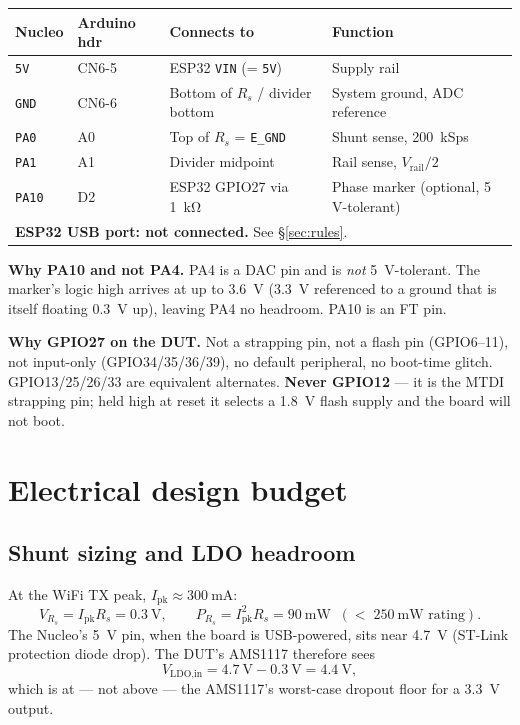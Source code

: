 \documentclass[11pt,a4paper]{article}
\begin{document}
\begin{center}
\begin{tabularx}{\textwidth}{llXl}
\toprule
\textbf{Nucleo} & \textbf{Arduino hdr} & \textbf{Connects to} & \textbf{Function} \\
\midrule
\texttt{5V}   & CN6-5 & ESP32 \texttt{VIN} (= \texttt{5V}) & Supply rail \\
\texttt{GND}  & CN6-6 & Bottom of $R_s$ / divider bottom   & System ground, ADC reference \\
\texttt{PA0}  & A0    & Top of $R_s$ = \texttt{E\_GND}     & Shunt sense, \SI{200}{kSps} \\
\texttt{PA1}  & A1    & Divider midpoint                    & Rail sense, $V_\text{rail}/2$ \\
\texttt{PA10} & D2    & ESP32 GPIO27 via \SI{1}{\kilo\ohm}  & Phase marker (optional, 5\,V-tolerant) \\
\midrule
\multicolumn{4}{l}{\textbf{ESP32 USB port: not connected.} See \S\ref{sec:rules}.} \\
\bottomrule
\end{tabularx}
\end{center}

\noindent
\textbf{Why PA10 and not PA4.} PA4 is a DAC pin and is \emph{not} \SI{5}{\volt}-tolerant.
The marker's logic high arrives at up to \SI{3.6}{\volt} (\SI{3.3}{\volt} referenced to a
ground that is itself floating \SI{0.3}{\volt} up), leaving PA4 no headroom. PA10 is an FT pin.

\medskip
\noindent
\textbf{Why GPIO27 on the DUT.} Not a strapping pin, not a flash pin (GPIO6--11), not
input-only (GPIO34/35/36/39), no default peripheral, no boot-time glitch. GPIO13/25/26/33 are
equivalent alternates. \textbf{Never GPIO12} --- it is the MTDI strapping pin; held high at
reset it selects a \SI{1.8}{\volt} flash supply and the board will not boot.

\section{Electrical design budget}

\subsection{Shunt sizing and LDO headroom}

At the WiFi TX peak, $I_\text{pk} \approx \SI{300}{\milli\ampere}$:
\[
V_{R_s} = I_\text{pk} R_s = \SI{0.3}{\volt},
\qquad
P_{R_s} = I_\text{pk}^2 R_s = \SI{90}{\milli\watt} \;\;(<\;\SI{250}{\milli\watt}\text{ rating}).
\]
The Nucleo's \SI{5}{\volt} pin, when the board is USB-powered, sits near
\SI{4.7}{\volt} (ST-Link protection diode drop). The DUT's AMS1117 therefore sees
\[
V_\text{LDO,in} = \SI{4.7}{\volt} - \SI{0.3}{\volt} = \SI{4.4}{\volt},
\]
which is at --- not above --- the AMS1117's worst-case dropout floor for a
\SI{3.3}{\volt} output.
\end{document}
